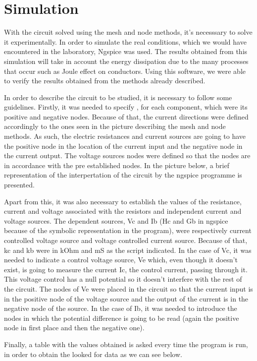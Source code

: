 
\section{Simulation}
\label{sec:simulation}

\par  With the circuit solved using the mesh and node methods, it's necesssary to solve it experimentally. In order to simulate the real conditions, which we would have encountered in the laboratory, Ngspice was used. The results obtained from this simulation will take in account the energy dissipation due to the many processes that occur such as Joule effect on conductors. Using this software, we were able to verify the results obtained from the methods already described. 
\par  In order to describe the circuit to be studied, it is necessary to follow some guidelines. Firstly, it was needed to specify , for each component, which were its positive and negative nodes. Because of that, the current directions were defined accordingly to the ones seen in the picture describing the mesh and node methods. As such, the electric resistances and current sources are going to have the positive node in the location of the current input and the negative node in the current output. The voltage sources nodes were defined so that the nodes are in accordance with the pre established nodes. In the picture below, a brief representation of the interpertation of the circuit by the ngspice programme is presented.



\par Apart from this, it was also necessary to establish the values of the resistance, current and voltage associated with the resistors and independent current and voltage sources. The dependent sources, Vc and Ib (Hc and Gb in ngspice because of the symbolic representation in the program), were respectively current controlled voltage source and voltage controlled current source. Because of that, kc and kb were in kOhm and mS as the script indicated. In the case of Vc, it was needed to indicate a control voltage source, Ve which, even though it doesn't exist, is going to measure the current Ic, the control current, passing through it. This voltage control has a null potential so it doesn't interfere with the rest of the circuit. The nodes of Ve were placed in the circuit so that the current input is in the positive node of the voltage source and the output of the current is in the negative node of the source.  In the case of Ib, it was needed to introduce the nodes in which the potential difference is going to be read (again the positive node in first place and then the negative one).

\par \noindent Finally, a table with the values obtained is asked every time the program is run, in order to obtain the looked for data as we can see below. 




